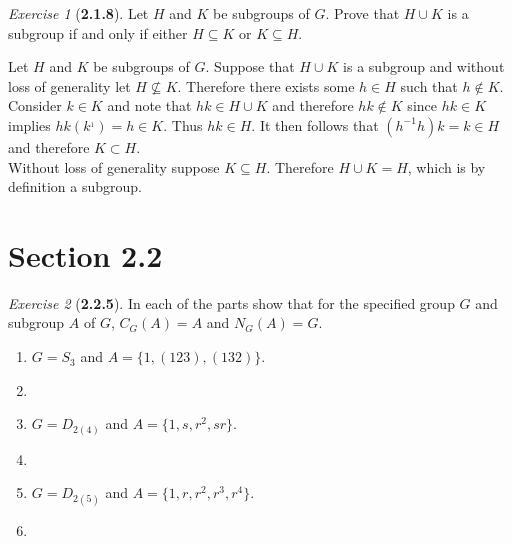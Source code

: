 \documentclass[12pt]{amsart}
\makeatletter
\theoremstyle{remark}
\newtheorem*{exercise}{Exercise}%
\renewenvironment{proof}[1][\proofname]{\par\doublespacing
  \pushQED{\qed}%
  \normalfont \topsep6\p@\@plus6\p@\relax
  \list{}{%
    \settowidth{\leftmargin}{\itshape\proofname:\hskip\labelsep}%
    \setlength{\labelwidth}{0pt}%
    \setlength{\itemindent}{-\leftmargin}%
  }%
  \item[\hskip\labelsep\itshape#1\@addpunct{:}]\ignorespaces
}{%
  \popQED\endlist\@endpefalse
  \singlespacing
}
\theoremstyle{mycomment}
\makeatother
\begin{document}
\begin{exercise}[\textbf{2.1.8}] Let $H$ and $K$ be subgroups of $G$. Prove that 
  $H \cup K$ is a subgroup if and only if either $H \subseteq K$ or $K \subseteq H$.
    \begin{proof} Let $H$ and $K$ be subgroups of $G$. Suppose that $H \cup K$ is a subgroup and without loss of generality let $H \not\subseteq K$. Therefore there exists some 
      $h \in H$ such that $h \not\in K$. Consider $k \in K$ and note that $hk \in H \cup K$ and therefore $hk \not\in K$ since $hk \in K$ implies $hk(k^{_1}) = h \in K$. Thus 
      $hk \in H$. It then follows that $(h^{-1}h)k = k \in H$ and therefore $K \subset H$.\\
      Without loss of generality suppose $K \subseteq H$. Therefore $H\cup K = H$, which is by definition a subgroup. 
    \end{proof}
\end{exercise}
\vspace{.15in}


\section*{\textbf{Section 2.2}}

\begin{exercise}[\textbf{2.2.5}] In each of the parts show that for the specified group $G$ and subgroup $A$ of $G$, 
  $C_G(A) = A$ and $N_G(A) = G$.
  \begin{enumerate}
    \item[a] $G = S_3$ and $A = \{1, (1 2 3), (1 3 2)\}$.
    \begin{proof}[Solution] 
    \end{proof} 

    \item[b] $G = D_{2(4)}$ and $A = \{1, s, r^2, sr\}$.
    \begin{proof}[Solution] 
    \end{proof} 

    \item[c] $G = D_{2(5)}$ and $A = \{1, r, r^2, r^3, r^4\}$.
    \begin{proof}[Solution]
    \end{proof}
  \end{enumerate}
\end{exercise}
\vspace{.15in}
\end{document}
